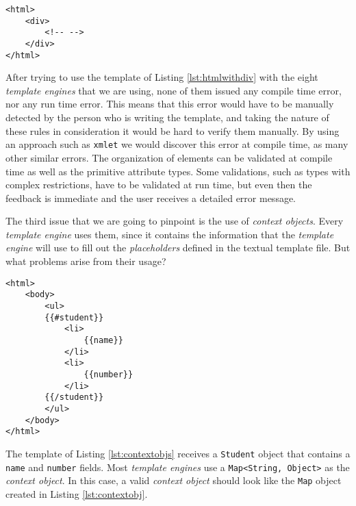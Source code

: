 \lstset{language = html}

\bigskip

\begin{minipage}{\linewidth}
\begin{lstlisting}[caption={Invalid Html Element Containing a Div Element}, label={lst:htmlwithdiv}]
<html>
    <div>
    	<!-- -->
    </div>
</html>
\end{lstlisting}
\end{minipage} 

\noindent
After trying to use the template of Listing \ref{lst:htmlwithdiv} with the eight \textit{template engines} that we are using, none of them issued any compile time error, nor any run time error. This means that this error would have to be manually detected by the person who is writing the template, and taking the nature of these rules in consideration it would be hard to verify them manually. By using an approach such as \texttt{xmlet} we would discover this error at compile time, as many other similar errors. The organization of elements can be validated at compile time as well as the primitive attribute types. Some validations, such as types with complex restrictions, have to be validated at run time, but even then the feedback is immediate and the user receives a detailed error message.

\noindent
The third issue that we are going to pinpoint is the use of \textit{context objects}. Every \textit{template engine} uses them, since it contains the information that the \textit{template engine} will use to fill out the \textit{placeholders} defined in the textual template file. But what problems arise from their usage?

\bigskip


\begin{minipage}{\linewidth}
\begin{lstlisting}[caption={HTML Template with Placeholders}, label={lst:contextobjs}, style=problemex]
<html>
    <body>
        <ul>
        {{#student}}
            <li>
                {{name}}
            </li>
            <li>
                {{number}}
            </li>
        {{/student}}
        </ul>
    </body>
</html>
\end{lstlisting}
\end{minipage} 

\noindent
The template of Listing \ref{lst:contextobjs} receives a \texttt{Student} object that contains a \texttt{name} and \texttt{number} fields. Most \textit{template engines} use a \texttt{Map<String, Object>} as the \textit{context object}. In this case, a valid \textit{context object} should look like the \texttt{Map} object created in Listing \ref{lst:contextobj}.

